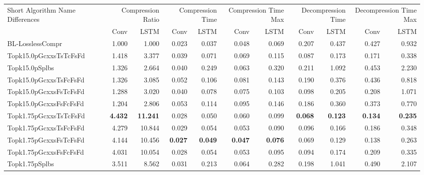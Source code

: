 \begin{tabular}{lrrrrrrrrrr}
\toprule
\multicolumn{1}{p{2.5cm}}{Short Algorithm Name Differences} & \multicolumn{2}{p{1.8cm}}{Compression Ratio} & \multicolumn{2}{p{1.8cm}}{Compression Time} & \multicolumn{2}{p{1.8cm}}{Compression Time Max} & \multicolumn{2}{p{1.8cm}}{Decompression Time} & \multicolumn{2}{p{1.8cm}}{Decompression Time Max} \\
 & Conv & LSTM & Conv & LSTM & Conv & LSTM & Conv & LSTM & Conv & LSTM \\
\midrule
BL-LosslessCompr & 1.000 & 1.000 & 0.023 & 0.037 & 0.048 & 0.069 & 0.207 & 0.437 & 0.427 & 0.932 \\
Topk15.0pGcxxsTsTcFsFd & 1.418 & 3.377 & 0.039 & 0.071 & 0.069 & 0.115 & 0.087 & 0.173 & 0.171 & 0.338 \\
Topk15.0pSplbs & 1.326 & 2.664 & 0.040 & 0.249 & 0.063 & 0.320 & 0.211 & 1.092 & 0.453 & 2.230 \\
Topk15.0pGcxxsTsFcFsFd & 1.326 & 3.085 & 0.052 & 0.106 & 0.081 & 0.143 & 0.190 & 0.376 & 0.436 & 0.818 \\
Topk15.0pGcxxsFsTcFsFd & 1.288 & 3.020 & 0.040 & 0.078 & 0.075 & 0.103 & 0.098 & 0.205 & 0.208 & 1.071 \\
Topk15.0pGcxxsFsFcFsFd & 1.204 & 2.806 & 0.053 & 0.114 & 0.095 & 0.146 & 0.186 & 0.360 & 0.373 & 0.770 \\
Topk1.75pGcxxsTsTcFsFd & \bfseries 4.432 & \bfseries 11.241 & 0.028 & 0.050 & 0.060 & 0.099 & \bfseries 0.068 & \bfseries 0.123 & \bfseries 0.134 & \bfseries 0.235 \\
Topk1.75pGcxxsTsFcFsFd & 4.279 & 10.844 & 0.029 & 0.054 & 0.053 & 0.090 & 0.096 & 0.166 & 0.186 & 0.348 \\
Topk1.75pGcxxsFsTcFsFd & 4.144 & 10.456 & \bfseries 0.027 & \bfseries 0.049 & \bfseries 0.047 & \bfseries 0.076 & 0.069 & 0.129 & 0.138 & 0.263 \\
Topk1.75pGcxxsFsFcFsFd & 4.031 & 10.054 & 0.028 & 0.054 & 0.053 & 0.095 & 0.094 & 0.174 & 0.209 & 0.335 \\
Topk1.75pSplbs & 3.511 & 8.562 & 0.031 & 0.213 & 0.064 & 0.282 & 0.198 & 1.041 & 0.490 & 2.107 \\
\bottomrule
\end{tabular}
